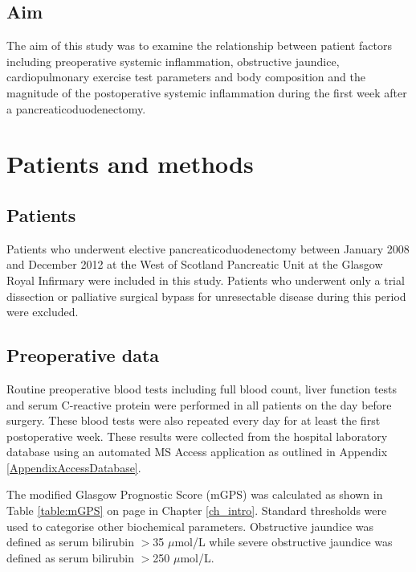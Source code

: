 \subsection{Aim}
The aim of this study was to examine the relationship between patient factors including preoperative systemic inflammation, obstructive jaundice, cardiopulmonary exercise test parameters and body composition and the magnitude of the postoperative systemic inflammation during the first week after a pancreaticoduodenectomy. 

\clearpage

\section{Patients and methods}

\subsection{Patients}
Patients who underwent elective pancreaticoduodenectomy between January 2008 and December 2012 at the West of Scotland Pancreatic Unit at the Glasgow Royal Infirmary were included in this study. 
Patients who underwent only a trial dissection or palliative surgical bypass for unresectable disease during this period were excluded.

\subsection{Preoperative data}
Routine preoperative blood tests including full blood count, liver function tests and serum C-reactive protein were performed in all patients on the day before surgery. 
These blood tests were also repeated every day for at least the first postoperative week. 
These results were collected from the hospital laboratory database using an automated MS Access application as outlined in Appendix \ref{AppendixAccessDatabase}. 

The modified Glasgow Prognostic Score (mGPS) was calculated as shown in Table \ref{table:mGPS} on page \pageref{table:mGPS} in Chapter \ref{ch_intro}. 
Standard thresholds were used to categorise other biochemical parameters. 
Obstructive jaundice was defined as serum bilirubin $>$35 $\mu$mol/L while severe obstructive jaundice was defined as serum bilirubin $>$250 $\mu$mol/L. 

